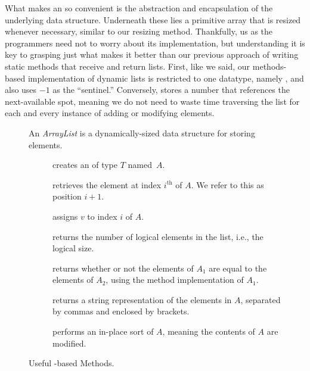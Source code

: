 What makes an  so convenient is the abstraction and encapsulation of the underlying data structure. Underneath these lies a primitive array that is resized whenever necessary, similar to our resizing method. Thankfully, us as the programmers need not to worry about its implementation, but understanding it is key to grasping just what makes it better than our previous approach of writing static methods that receive and return lists. First, like we said, our methods-based implementation of dynamic lists is restricted to one datatype, namely , and also uses $-1$ as the ``sentinel.'' Conversely,  stores a number that references the next-available spot, meaning we do not need to waste time traversing the list for each and every instance of adding or modifying elements.

\begin{figure}[tp]
  \small
  \begin{tcolorbox}[title=Java Array Lists]
    An \emph{ArrayList} is a dynamically-sized data structure for storing elements.
    \vspace{2ex}
  \begin{description}
    \item [] creates an  of type $T$ named~$A$.
    \item [] retrieves the element at index $i^{\text{th}}$ of $A$. We refer to this as position $i + 1$. 
    \item [] assigns $v$ to index $i$ of $A$.
    \item [] returns the number of logical elements in the list, i.e., the logical size.
    \item [] returns whether or not the elements of $A_1$ are equal to the elements of $A_2$, using the  method implementation of $A_1$.
    \item [] returns a string representation of the elements in $A$, separated by commas and enclosed by brackets.
    \item [] performs an in-place sort of $A$, meaning the contents of $A$ are modified.
  \end{description}
\end{tcolorbox}
  \caption{Useful -based Methods.}
  \label{fig:arraylists}
\end{figure}

